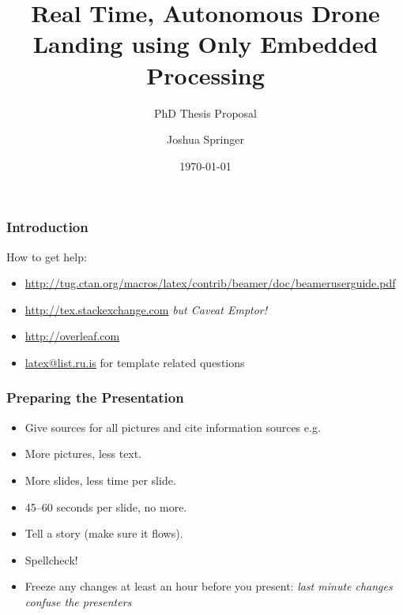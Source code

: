 \documentclass[aspectratio=169]{rubeamer}
\title[RU Presentation]{Real Time, Autonomous Drone Landing using Only Embedded Processing}
\subtitle[demo]{PhD Thesis Proposal}
\author[Springer]{Joshua Springer}
\institute[RU]{Reykjavík University}
\date[2022]{\monthyeardate\today}%
\begin{document}
\begin{frame}[plain]%
  \titlepage

\end{frame}


\begin{frame}
  \frametitle{Introduction}
  How to get help:
  \begin{itemize}
  \item \url{http://tug.ctan.org/macros/latex/contrib/beamer/doc/beameruserguide.pdf}
  \item \url{http://tex.stackexchange.com}  {\it but Caveat Emptor!}\/
  \item \url{http://overleaf.com}
  \item \url{latex@list.ru.is} for template related questions
  \end{itemize}

\end{frame}

\begin{frame}
  \frametitle{Preparing the Presentation}
  \begin{itemize}
  \item Give sources for all pictures and cite information sources e.g. \cite{vossebeld2018customer}
  \item More pictures, less text.
  \item More slides, less time per slide.
  \item 45--60 seconds per slide, no more.
  \item Tell a story (make sure it flows).
  \item Spellcheck!
  \item Freeze any changes at least an hour before you present:  {\em last minute changes confuse the presenters}\/
  \end{itemize}
\end{frame}
\end{document}
